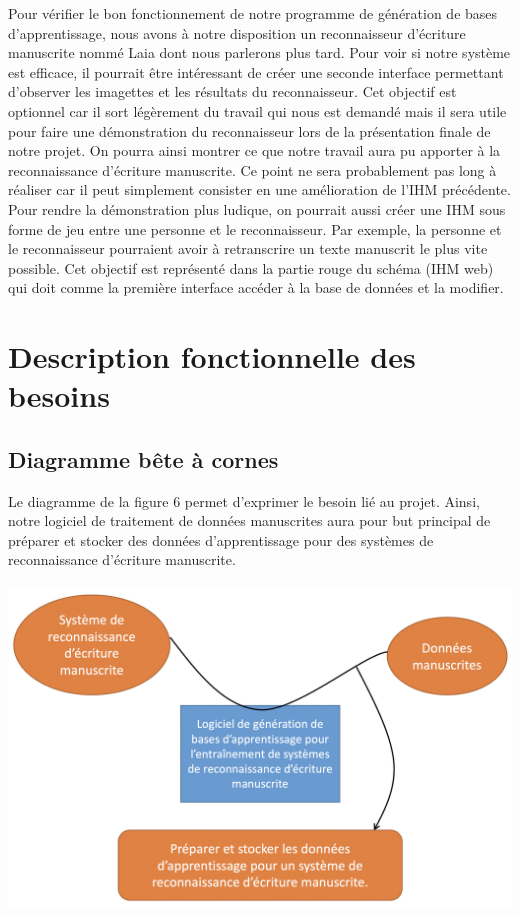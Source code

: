 Pour vérifier le bon fonctionnement de notre programme de génération de bases d’apprentissage, nous avons à notre
disposition un reconnaisseur d’écriture manuscrite nommé Laia\cite{laia:2016} dont nous parlerons plus tard.
Pour voir si notre système est efficace, il pourrait être intéressant de créer une seconde interface permettant
d’observer les imagettes et les résultats du reconnaisseur. Cet objectif est optionnel car il sort légèrement du
travail qui nous est demandé mais il sera utile pour faire une démonstration du reconnaisseur lors de la présentation
finale de notre projet. On pourra ainsi montrer ce que notre travail aura pu apporter à la reconnaissance d’écriture
manuscrite. Ce point ne sera probablement pas long à réaliser car il peut simplement consister en une amélioration
de l’IHM précédente. Pour rendre la démonstration plus ludique, on pourrait aussi créer une IHM sous forme de jeu
entre une personne et le reconnaisseur. Par exemple, la personne et le reconnaisseur pourraient avoir à retranscrire
un texte manuscrit le plus vite possible. Cet objectif est représenté dans la partie rouge du schéma (IHM web) qui
doit comme la première interface accéder à la base de données et la modifier.

\section{Description fonctionnelle des besoins}

\subsection{Diagramme bête à cornes}

Le diagramme de la figure 6 permet d’exprimer le besoin lié au projet. Ainsi, notre logiciel de
traitement de données manuscrites aura pour but principal de préparer et stocker des données
d’apprentissage pour des systèmes de reconnaissance d’écriture manuscrite.

\newpage

\paragraph{}
\begin{mdframed}[frametitle={Figure 6 : Diagramme bête à cornes}, innerbottommargin=10]
\begin{center}
\includegraphics[width=0.6\linewidth]{bete-a-cornes.png}
\end{center}
\end{mdframed}

